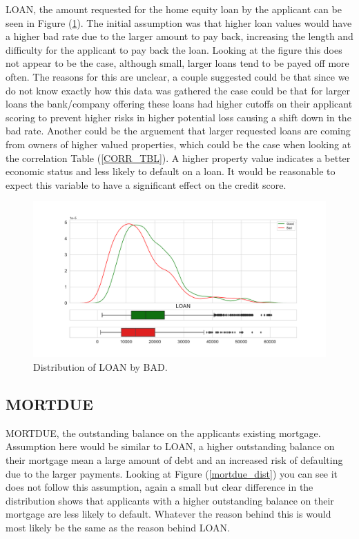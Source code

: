 LOAN,  the amount requested for the home equity loan by the applicant can be seen in Figure (\ref{loan_dist}). The initial assumption was that higher loan values would have a higher bad rate due to the larger amount to pay back,  increasing the length and difficulty for the applicant to pay back the loan. Looking at the figure this does not appear to be the case,  although small,  larger loans tend to be payed off more often. The reasons for this are unclear,  a couple suggested could be that since we do not know exactly how this data was gathered the case could be that for larger loans the bank/company offering these loans had higher cutoffs on their applicant scoring to prevent higher risks in higher potential loss causing a shift down in the bad rate. Another could be the arguement that larger requested loans are coming from owners of higher valued properties,  which could be the case when looking at the correlation Table (\ref{CORR_TBL}). A higher property value indicates a better economic status and less likely to default on a loan. It would be reasonable to expect this variable to have a significant effect on the credit score.

\begin{figure}[H]
	\centering
	\includegraphics[scale=0.40]{figs/loan_dist.pdf}
	\caption{Distribution of LOAN by BAD. \label{loan_dist}}
\end{figure}

\subsection*{MORTDUE}

MORTDUE,  the outstanding balance on the applicants existing mortgage. Assumption here would be similar to LOAN,  a higher outstanding balance on their mortgage mean a large amount of debt and an increased risk of defaulting due to the larger payments. Looking at Figure (\ref{mortdue_dist}) you can see it does not follow this assumption,  again a small but clear difference in the distribution shows that applicants with a higher outstanding balance on their mortgage are less likely to default. Whatever the reason behind this is would most likely be the same as the reason behind LOAN.

